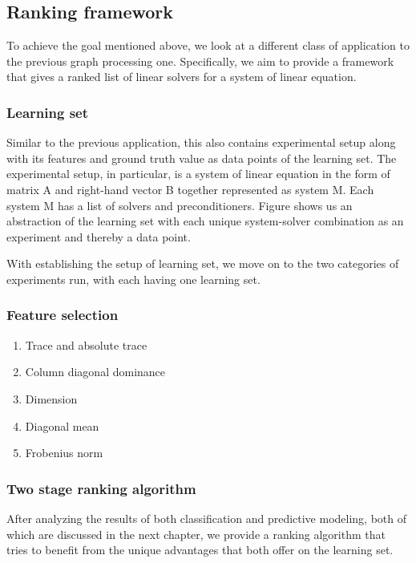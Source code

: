 \subsection{Ranking framework}
To achieve the goal mentioned above, we look at a different class of application to the previous graph processing one. Specifically, we aim to provide a framework that gives a ranked list of linear solvers for a system of linear equation.

\subsubsection{Learning set}
Similar to the previous application, this also contains experimental setup along with its features and ground truth value as data points of the learning set. The experimental setup, in particular, is a system of linear equation in the form of matrix A and right-hand vector B together represented as system M. Each system M has a list of solvers and preconditioners. Figure shows us an abstraction of the learning set with each unique system-solver combination as an experiment and thereby a data point. 

With establishing the setup of learning set, we move on to the two categories of experiments run, with each having one learning set.

\subsubsection{Feature selection}

\begin{enumerate}
    \item Trace and absolute trace
    \item Column diagonal dominance
    \item Dimension
    \item Diagonal mean
    \item Frobenius norm
\end{enumerate}

\subsubsection{Two stage ranking algorithm}
After analyzing the results of both classification and predictive modeling, both of which are discussed in the next chapter, we provide a ranking algorithm that tries to benefit from the unique advantages that both offer on the learning set. 



